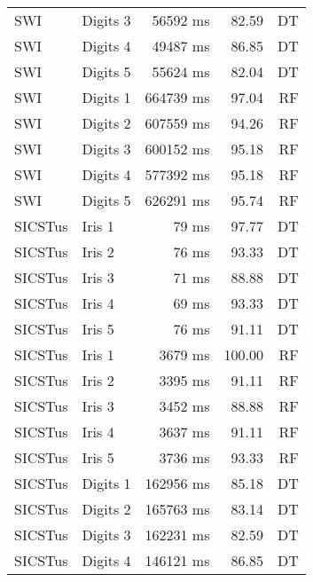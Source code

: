 \begin{longtable}{llrrr}
  SWI & Digits 3               & 56592 ms              &  82.59   & DT \\
  SWI & Digits 4               & 49487 ms              &  86.85  & DT  \\
  SWI & Digits 5               & 55624 ms              &  82.04  & DT  \\
  \addlinespace
  SWI & Digits 1               & 664739 ms               &  97.04  & RF  \\
  SWI & Digits 2               & 607559 ms               &  94.26  & RF  \\
  SWI & Digits 3               & 600152 ms               &  95.18  & RF  \\
  SWI & Digits 4               & 577392 ms               &  95.18  & RF  \\
  SWI & Digits 5               & 626291 ms               &  95.74  & RF  \\
  \addlinespace
  SICSTus & Iris 1               & 79 ms              &  97.77 & DT   \\
  SICSTus & Iris 2               & 76 ms              &  93.33 & DT   \\
  SICSTus & Iris 3               & 71 ms              &  88.88 & DT   \\
  SICSTus & Iris 4               & 69  ms             &  93.33  & DT  \\
  SICSTus & Iris 5               & 76 ms              &  91.11  & DT  \\
  \addlinespace
  SICSTus & Iris 1               & 3679  ms             &  100.00  & RF  \\
  SICSTus & Iris 2               & 3395  ms             &  91.11  & RF  \\
  SICSTus & Iris 3               & 3452  ms             &  88.88   & RF \\
  SICSTus & Iris 4               & 3637  ms             &  91.11  & RF  \\
  SICSTus & Iris 5               & 3736  ms             &  93.33  & RF  \\
  \addlinespace
  SICSTus & Digits 1               & 162956 ms              &  85.18  & DT  \\
  SICSTus & Digits 2               & 165763 ms              &  83.14  & DT  \\
  SICSTus & Digits 3               & 162231 ms              &  82.59  & DT  \\
  SICSTus & Digits 4               & 146121 ms              &  86.85  & DT  \\

\end{longtable}
